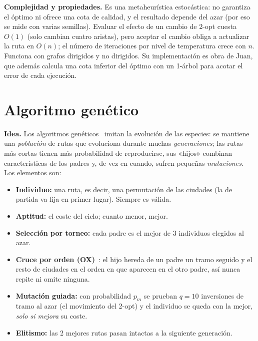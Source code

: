 \textbf{Complejidad y propiedades.} Es una metaheurística estocástica: no garantiza el óptimo ni ofrece una cota de calidad, y el resultado depende del azar (por eso se mide con varias semillas). Evaluar el efecto de un cambio de 2-opt cuesta $O(1)$ (solo cambian cuatro aristas), pero aceptar el cambio
obliga a actualizar la ruta en $O(n)$; el número de iteraciones por nivel de temperatura crece con $n$. Funciona con grafos dirigidos y no dirigidos. Su implementación es obra de Juan, que además calcula una cota inferior del óptimo con un 1-árbol para acotar el error de cada ejecución.

\section{Algoritmo genético}\label{sec:genetico}

\textbf{Idea.} Los algoritmos genéticos~\cite{holland1975} imitan la evolución de las especies: se mantiene una \emph{población} de rutas que evoluciona durante muchas \emph{generaciones}; las rutas más cortas tienen más probabilidad de reproducirse, sus «hijos» combinan características de los padres
y, de vez en cuando, sufren pequeñas \emph{mutaciones}. Los elementos son:
\begin{itemize}
  \item \textbf{Individuo:} una ruta, es decir, una permutación de las ciudades (la de partida va fija en primer lugar). Siempre es válida.
  \item \textbf{Aptitud:} el coste del ciclo; cuanto menor, mejor.
  \item \textbf{Selección por torneo:} cada padre es el mejor de 3 individuos elegidos al azar.
  \item \textbf{Cruce por orden (OX)}~\cite{davis1985}: el hijo hereda de un padre un tramo seguido y el resto de ciudades en el orden en que aparecen en el otro padre, así nunca repite ni omite ninguna.
  \item \textbf{Mutación guiada:} con probabilidad $p_m$ se prueban $q=10$ inversiones de tramo al azar (el movimiento del 2-opt) y el individuo se queda con la mejor, \emph{solo si mejora} su coste.
  \item \textbf{Elitismo:} las 2 mejores rutas pasan intactas a la siguiente generación.
\end{itemize}

